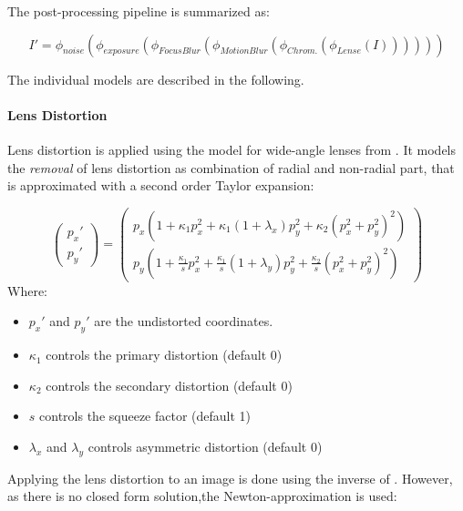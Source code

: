 The post-processing pipeline is summarized as:

\begin{equation}
	I' = \phi_{noise}(\phi_{exposure}(\phi_{FocusBlur}(\phi_{MotionBlur}(\phi_{Chrom.}(\phi_{Lense}(I))))))
	\label{eq:postprocess}
\end{equation}

The individual models are described in the following.

\paragraph{Lens Distortion}


Lens distortion is applied using the model for wide-angle lenses from \cite{Vass}. It models the \textit{removal} of lens distortion as combination of radial and non-radial part, that is approximated with a second order Taylor expansion:

\begin{equation}
\begin{pmatrix}
	p_x' \\
	p_y'
\end{pmatrix} = \begin{pmatrix}
p_x(1 + \kappa_1 p_x^2 + \kappa_1 (1 + \lambda _x)p_y^2 + \kappa_2(p_x^2 + p_y^2)^2) \\
p_y(1 + \frac{\kappa_1 }{s}p_x^2 + \frac{\kappa_1}{s} (1 + \lambda _y)p_y^2 + \frac{\kappa_2}{s}(p_x^2 + p_y^2)^2)
\end{pmatrix} 
\label{eq:distortion}
\end{equation}
Where:
\begin{itemize}
	\item $p_x'$ and $p_y'$ are the undistorted coordinates.
	\item $\kappa_1$ controls the primary distortion (default 0)
	\item $\kappa_2$ controls the secondary distortion (default 0)
	\item $s$ controls the squeeze factor (default 1)
	\item $\lambda_x$ and $\lambda_y$ controls asymmetric distortion (default 0)
\end{itemize}
 
Applying the lens distortion to an image is done using the inverse of . However, as there is no closed form solution,the Newton-approximation is used:

